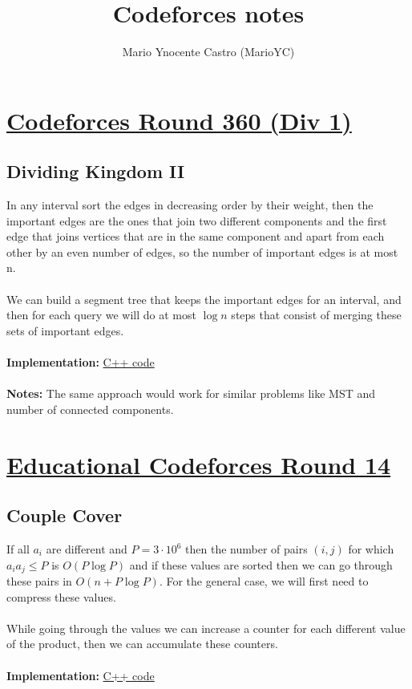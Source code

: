 \documentclass[a4paper,12pt]{article}
\title{Codeforces notes}
\author{Mario Ynocente Castro (MarioYC)}
\date{}
\begin{document}
\maketitle
\thispagestyle{empty}

\newpage
\tableofcontents

\newpage
\section{\href{http://codeforces.com/contest/687}{Codeforces Round 360 (Div 1)}}

\subsection{Dividing Kingdom II}

In any interval sort the edges in decreasing order by their weight, then the important edges are the ones that join two different components and the first edge that joins vertices that are in the same component and apart from each other by an even number of edges, so the number of important edges is at most n.
\\ \\
We can build a segment tree that keeps the important edges for an interval, and then for each query we will do at most $\log n$ steps that consist of merging these sets of important edges.
\\ \\
\textbf{Implementation:} \href{http://codeforces.com/contest/687/submission/19196725}{C++ code}
\\ \\
\textbf{Notes:} The same approach would work for similar problems like MST and number of connected components.

\section{\href{http://codeforces.com/contest/691}{Educational Codeforces Round 14}}

\subsection{Couple Cover}

If all $a_i$ are different and $P = 3 \cdot 10^6$ then the number of pairs $(i,j)$ for which $a_i a_j \leq P$ is $O(P\log P)$ and if these values are sorted then we can go through these pairs in $O(n + P\log P)$. For the general case, we will first need to compress these values.
\\ \\
While going through the values we can increase a counter for each different value of the product, then we can accumulate these counters.
\\ \\
\textbf{Implementation:} \href{http://codeforces.com/contest/691/submission/19352079}{C++ code}
\end{document}
